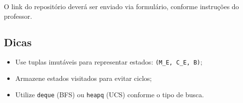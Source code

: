 \documentclass[9pt,a4paper]{extarticle}
\begin{document}
O link do repositório deverá ser enviado via formulário, conforme instruções do professor.

\subsection*{Dicas}

\begin{itemize}
  \item Use tuplas imutáveis para representar estados: \texttt{(M\_E, C\_E, B)};
  \item Armazene estados visitados para evitar ciclos;
  \item Utilize \texttt{deque} (BFS) ou \texttt{heapq} (UCS) conforme o tipo de busca.
\end{itemize}
\end{document}
